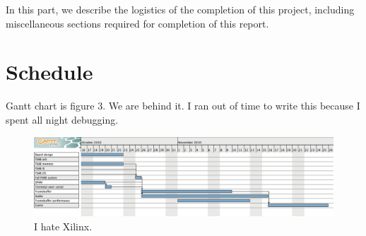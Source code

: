 \documentclass[10pt]{article}
\begin{document}
In this part, we describe the logistics of the completion of this project,
including miscellaneous sections required for completion of this report.

\section{Schedule}

Gantt chart is figure 3.  We are behind it.  I ran out of time to write
this because I spent all night debugging.

\begin{figure}
  \centering
    \includegraphics[width=\textwidth]{gantt-chart.png}
  \caption{I hate Xilinx.} \label{fig:gantt}
\end{figure}
\end{document}
